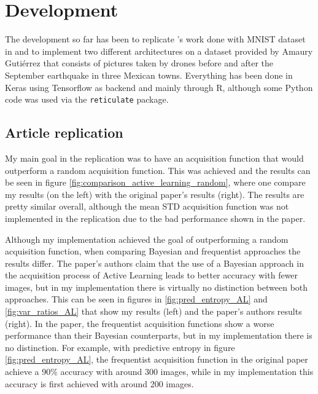 \section{Development}

The development so far has been to replicate \citeauthor{Gal2016Active}'s work done with MNIST dataset in  and to implement two different architectures on a dataset provided by Amaury Gutiérrez that consists of pictures taken by drones before and after the September earthquake in three Mexican towns. Everything has been done in Keras using Tensorflow as backend and mainly through R, although some Python code was used via the \texttt{reticulate} package.

\subsection{Article replication}

My main goal in the replication  was to have an acquisition function that would outperform a random acquisition function. This was achieved and the results can be seen in figure \ref{fig:comparison_active_learning_random}, where one compare my results (on the left) with the original paper's results (right). The results are pretty similar overall, although the mean STD acquisition function was not implemented in the replication due to the bad performance shown in the paper.

Although my implementation achieved the goal of outperforming a random acquisition function, when comparing Bayesian and frequentist approaches the results differ. The paper's authors claim that the use of a Bayesian approach in the acquisition process of Active Learning leads to better accuracy with fewer images, but in my implementation there is virtually no distinction between both approaches. This can be seen in figures in \ref{fig:pred_entropy_AL} and \ref{fig:var_ratios_AL} that show my results (left) and the paper's authors results (right). In the paper, the frequentist acquisition functions show a worse performance than their Bayesian counterparts, but in my implementation there is no distinction. For example, with predictive entropy in figure \ref{fig:pred_entropy_AL}, the frequentist acquisition function in the original paper achieve a 90\% accuracy with around 300 images, while in my implementation this accuracy is first achieved with around 200 images.

